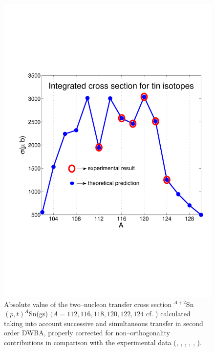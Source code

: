   \begin{figure}
  \centerline{\includegraphics*[width=\textwidth,angle=0]{nutshell/figs/cross_strength.pdf}}
  \caption{Absolute value of the  two--nucleon transfer cross section $^{A+2}$Sn$(p,t)^A$Sn(gs) $(A=112,116,118,120,122,124$ cf. \cite{Potel:13} \cite{Potel:13b}) calculated taking into account successive and simultaneous transfer in second order DWBA, properly corrected for non--orthogonality contributions in comparison with the experimental data (\cite{Guazzoni:99}, \cite{Guazzoni:04}, \cite{Guazzoni:06}, \cite{Guazzoni:08}, \cite{Guazzoni:11}, \cite{Guazzoni:12}).}\label{fig1.5}
  \end{figure}



